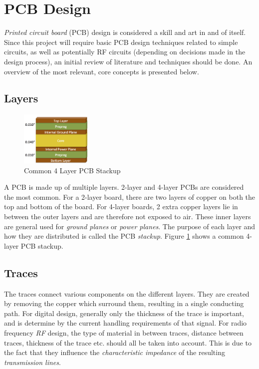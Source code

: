 \graphicspath{{./figures}}

\section{PCB Design}

\textit{Printed circuit board} (PCB) design is considered a skill and art in and of itself. Since this project will require basic PCB design techniques related to simple circuits, as well as potentially RF circuits (depending on decisions made in the design process), an initial review of literature and techniques should be done. An overview of the most relevant, core concepts is presented below.

\subsection{Layers}
\begin{figure}[!htb]
  \centering
  \includegraphics[width=0.3\textwidth]{4layerPCB}
  \caption{Common 4 Layer PCB Stackup \cite{site-4layerPCB}}
  \label{fig:4layerPCB}
\end{figure}

A PCB is made up of multiple layers. 2-layer and 4-layer PCBs are considered the most common. For a 2-layer board, there are two layers of copper on both the top and bottom of the board. For 4-layer boards, 2 extra copper layers lie in between the outer layers and are therefore not exposed to air. These inner layers are general used for \textit{ground planes} or \textit{power planes}. The purpose of each layer and how they are distributed is called the PCB \textit{stackup}. Figure \ref{fig:4layerPCB} shows a common 4-layer PCB stackup. \cite{site-pcbLayers}

\subsection{Traces}
The traces connect various components on the different layers. They are created by removing the copper which surround them, resulting in a single conducting path. For digital design, generally only the thickness of the trace is important, and is determine by the current handling requirements of that signal. For radio frequency \textit{RF} design, the type of material in between traces, distance between traces, thickness of the trace etc. should all be taken into account. This is due to the fact that they influence the \textit{characteristic impedance} of the resulting \textit{transmission lines}.

